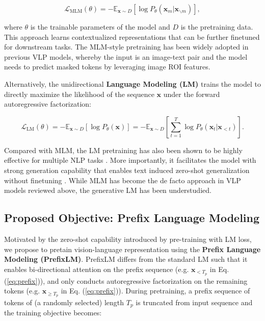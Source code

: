 \begin{equation}
    \mathcal{L}_\text{MLM}(\theta) = - \mathbb{E}_{\textbf{x} \sim D} \left[ \log P_{\theta}(\textbf{x}_m | \textbf{x}_{\backslash m}) \right],
\end{equation}

where $\theta$ is the trainable parameters of the model and $D$ is the pretraining data. This approach learns contextualized representations that can be further finetuned for downstream tasks. The MLM-style pretraining has been widely adopted in previous VLP models, whereby the input is an image-text pair and the model needs to predict masked tokens by leveraging image ROI features.

Alternatively, the unidirectional \textbf{Language Modeling (LM)} trains the model to directly maximize the likelihood of the sequence $\textbf{x}$ under the forward autoregressive factorization:

\begin{equation}
    \mathcal{L}_\text{LM}(\theta) = - \mathbb{E}_{\textbf{x} \sim D} \left[ \log P_{\theta}(\textbf{x}) \right] = - \mathbb{E}_{\textbf{x} \sim D} \left[ \sum_{t=1}^{T} \log P_{\theta}(\textbf{x}_t|\textbf{x}_{<t}) \right].
\end{equation}

Compared with MLM, the LM pretraining has also been shown to be highly effective for multiple NLP tasks \citep{radford2018improving}. More importantly, it facilitates the model with strong generation capability that enables text induced zero-shot generalization without finetuning \citep{brown2020language}. While MLM has become the de facto approach in VLP models reviewed above, the generative LM has been understudied.

\subsection{Proposed Objective: Prefix Language Modeling}

Motivated by the zero-shot capability introduced by pre-training with LM loss, we propose to pretain vision-language representation using the \textbf{Prefix Language Modeling (PrefixLM)}. PrefixLM differs from the standard LM such that it enables bi-directional attention on the prefix sequence (e.g. $\textbf{x}_{<T_p}$ in Eq. (\ref{eq:prefix})),
and only conducts autoregressive factorization on the remaining tokens (e.g. $\textbf{x}_{\geq T_p}$ in Eq. (\ref{eq:prefix})).
During pretraining, a prefix sequence of tokens of (a randomly selected) length $T_p$ is truncated from input sequence and the training objective becomes:

